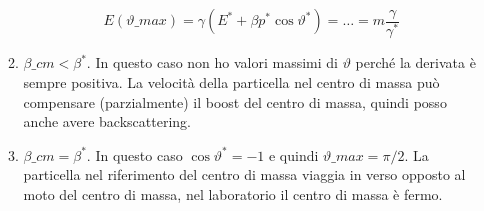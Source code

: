 \begin{itemize}
\begin{enumerate}
        \begin{equation*}
        E(\vartheta\_{max})=\gamma(E^*+\beta p^*\cos\vartheta^*)=\dots=m\frac{\gamma}{\gamma^*}
        \end{equation*}
        \item $\beta\_{cm}<\beta^*$. In questo caso non ho valori massimi di $\vartheta$ perché la derivata è sempre positiva. La velocità della particella nel centro di massa può compensare (parzialmente) il boost del centro di massa, quindi posso anche avere backscattering.
        \item $\beta\_{cm}=\beta^*$. In questo caso $\cos\vartheta^*=-1$ e quindi $\vartheta\_{max}=\pi/2$. La particella nel riferimento del centro di massa viaggia in verso opposto al moto del centro di massa, nel laboratorio il centro di massa è fermo.
    \end{enumerate}
\end{itemize}

